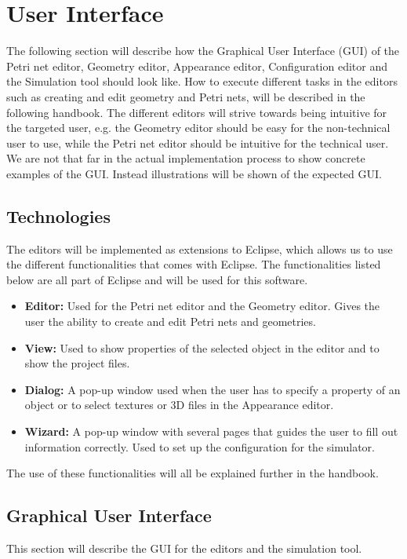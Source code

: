 
\section{User Interface}
The following section will describe how the Graphical User Interface (GUI) of the Petri net editor, Geometry editor, Appearance editor, Configuration editor and the Simulation tool should look like. How to execute different tasks in the editors such as creating and edit geometry and Petri nets, will be described in the following handbook. The different editors will strive towards being intuitive for the targeted user, e.g. the Geometry editor should be easy for the non-technical user to use, while the Petri net editor should be intuitive for the technical user. 
We are not that far in the actual implementation process to show concrete examples of the GUI. Instead illustrations will be shown of the expected GUI. 

\subsection{Technologies}
The editors will be implemented as extensions to Eclipse, which allows us to use the different functionalities that comes with Eclipse. The functionalities listed below are all part of Eclipse and will be used for this software.

\begin{itemize}
\item{\textbf{Editor:} Used for the Petri net editor and the Geometry editor. Gives the user the ability to create and edit Petri nets and geometries.}
\item{\textbf{View:} Used to show properties of the selected object in the editor and to show the project files.}
\item{\textbf{Dialog:} A pop-up window used when the user has to specify a property of an object or to select textures or 3D files in the Appearance editor.}
\item{\textbf{Wizard:} A pop-up window with several pages that guides the user to fill out information correctly. Used to set up the configuration for the simulator.}
\end{itemize}

The use of these functionalities will all be explained further in the handbook. 

\subsection{Graphical User Interface}
This section will describe the GUI for the editors and the simulation tool. 

